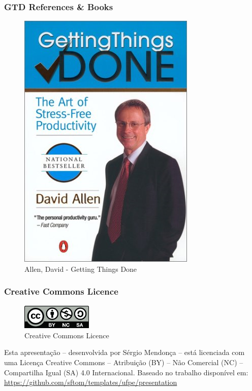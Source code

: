 \documentclass{beamer}
\begin{document}
\begin{frame}[t]\frametitle{GTD References \& Books}
    
\begin{figure}[tb]
	\begin{center}
		\includegraphics[width=0.38\linewidth]{img/gtd-book.png}
	\end{center}
	\caption{Allen, David - Getting Things Done}
	\label{fig:figure1}
\end{figure}

\end{frame}

 \begin{frame}[c]\frametitle{Creative Commons Licence}
     \begin{figure}[ht]
          \centering
          \caption{\label{fig:by-nc-sa} Creative Commons Licence}
          \includegraphics[width=0.3\textwidth]{./img/by-nc-sa.jpg}
      \end{figure} 
      Esta apresentação -- desenvolvida por Sérgio Mendonça -- está licenciada com uma Licença Creative Commons -- Atribuição (BY) -- Não Comercial (NC) -- Compartilha Igual (SA) 4.0 Internacional. Baseado no trabalho disponível em: \url{https://github.com/sftom/templates/ufpe/presentation}
 \end{frame}
\end{document}
